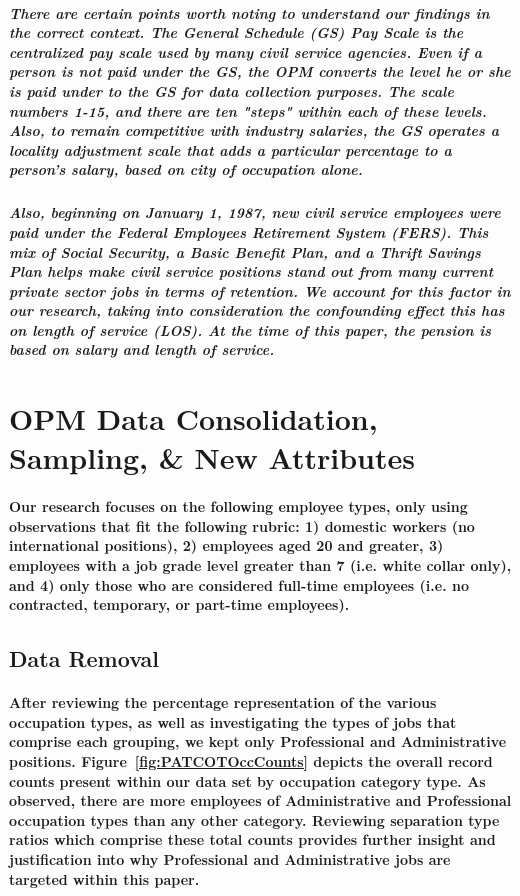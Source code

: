 \documentclass[10pt]{article}
\begin{document}
\subparagraph{There are certain points worth noting to understand our findings in the correct context.  The General Schedule (GS) Pay Scale is the centralized pay scale used by many civil service agencies. Even if a person is not paid under the GS, the OPM converts the level he or she is paid under to the GS for data collection purposes. The scale numbers 1-15, and there are ten "steps" within each of these levels.  Also, to remain competitive with industry salaries, the GS operates a locality adjustment scale that adds a particular percentage to a person’s salary, based on city of occupation alone.}

\subparagraph{Also, beginning on January 1, 1987,  new civil service employees were paid under the Federal Employees Retirement System (FERS). This mix of Social Security, a Basic Benefit Plan, and a Thrift Savings Plan helps make civil service positions stand out from many current private sector jobs in terms of retention. We account for this factor in our research, taking into consideration the confounding effect this has on length of service (LOS). At the time of this paper, the pension is based on salary and length of service.}


\section{OPM Data Consolidation, Sampling, \& New Attributes}

\paragraph{Our research focuses on the following employee types, only using observations that fit the following rubric: 1) domestic workers (no international positions), 2) employees aged 20 and greater, 3) employees with a job grade level greater than 7 (i.e. white collar only), and 4) only those who are considered full-time employees (i.e. no contracted, temporary, or part-time employees).}  
  
 
\subsection{Data Removal}

\paragraph{After reviewing the percentage representation of the various occupation types, as well as investigating the types of jobs that comprise each grouping, we kept only Professional and Administrative positions. Figure~\ref{fig:PATCOTOccCounts} depicts the overall record counts present within our data set by occupation category type. As observed, there are more employees of Administrative and Professional occupation types than any other category. Reviewing separation type ratios which comprise these total counts provides further insight and justification into why Professional and Administrative jobs are targeted within this paper.}
\end{document}
